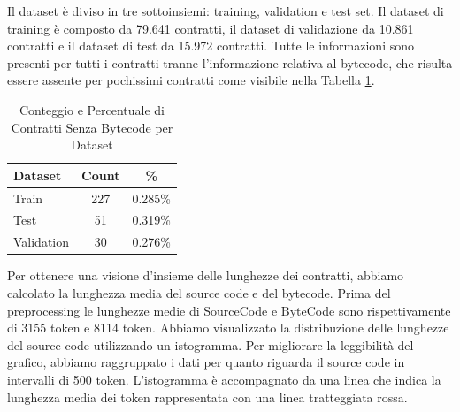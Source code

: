 \documentclass[../../Thesis.tex]{subfiles}
\begin{document}
Il dataset è diviso in tre sottoinsiemi: training, validation e test set.
Il dataset di training è composto da 79.641 contratti, il dataset di validazione da 10.861 contratti e il dataset di test da 15.972 contratti.
Tutte le informazioni sono presenti per tutti i contratti tranne l'informazione relativa al bytecode, che risulta essere assente per pochissimi contratti come visibile nella Tabella \ref{tab:no_bytecode_count}. 
\begin{table}[h!]
    \centering
    \begin{tabular}{|l|c|c|}
        \hline
        \textbf{Dataset} & \textbf{Count} & \textbf{\%} \\
        \hline
        Train & 227 & 0.285\% \\
        Test & 51 & 0.319\% \\
        Validation & 30 & 0.276\% \\
        \hline
    \end{tabular}
    \caption{Conteggio e Percentuale di Contratti Senza Bytecode per Dataset}
    \label{tab:no_bytecode_count}
\end{table}
Per ottenere una visione d'insieme delle lunghezze dei contratti, abbiamo calcolato la lunghezza media del source code e del bytecode. Prima del preprocessing le lunghezze medie di SourceCode e ByteCode sono rispettivamente di 3155 token e 8114 token.
Abbiamo visualizzato la distribuzione delle lunghezze del source code utilizzando un istogramma. Per migliorare la leggibilità del grafico, abbiamo raggruppato i dati per quanto riguarda il source code in intervalli di 500 token. L'istogramma è accompagnato da una linea che indica la lunghezza media dei token rappresentata con una linea tratteggiata rossa.
\end{document}

